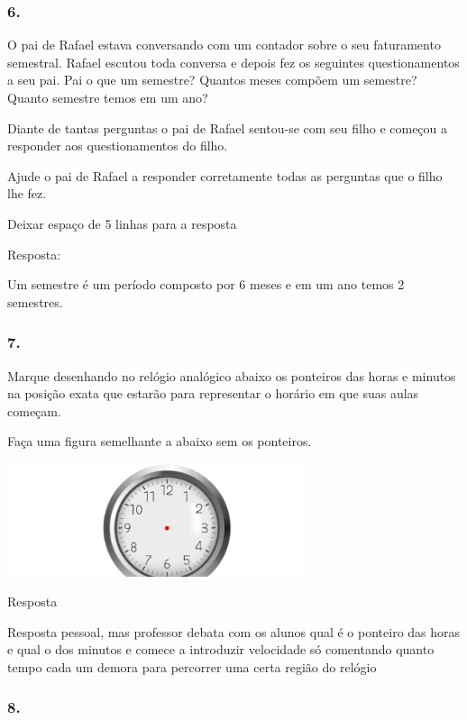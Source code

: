 \subsubsection{6.}\label{section-69}

O pai de Rafael estava conversando com um contador sobre o seu
faturamento semestral. Rafael escutou toda conversa e depois fez os
seguintes questionamentos a seu pai. Pai o que um semestre? Quantos
meses compõem um semestre? Quanto semestre temos em um ano?

Diante de tantas perguntas o pai de Rafael sentou-se com seu filho e
começou a responder aos questionamentos do filho.

Ajude o pai de Rafael a responder corretamente todas as perguntas que o
filho lhe fez.

Deixar espaço de 5 linhas para a resposta

Resposta:

Um semestre é um período composto por 6 meses e em um ano temos 2
semestres.

\subsubsection{7.}\label{section-70}

Marque desenhando no relógio analógico abaixo os ponteiros das horas e
minutos na posição exata que estarão para representar o horário em que
suas aulas começam.

Faça uma figura semelhante a abaixo sem os ponteiros.

\includegraphics[width=3.42530in,height=1.30845in]{media/image48.png}

Resposta

Resposta pessoal, mas professor debata com os alunos qual é o ponteiro
das horas e qual o dos minutos e comece a introduzir velocidade só
comentando quanto tempo cada um demora para percorrer uma certa região
do relógio

\subsubsection{8.}\label{section-71}

